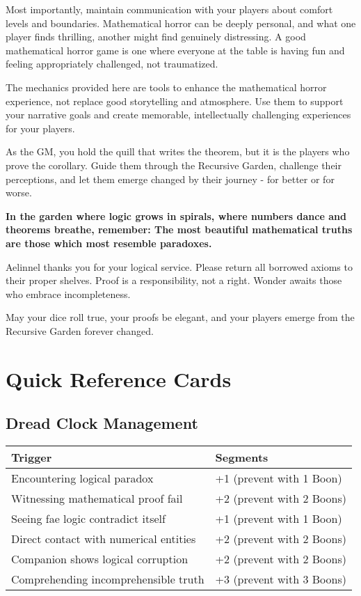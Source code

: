 \documentclass[11pt]{article}
\begin{document}
Most importantly, maintain communication with your players about comfort levels and boundaries. Mathematical horror can be deeply personal, and what one player finds thrilling, another might find genuinely distressing. A good mathematical horror game is one where everyone at the table is having fun and feeling appropriately challenged, not traumatized.

The mechanics provided here are tools to enhance the mathematical horror experience, not replace good storytelling and atmosphere. Use them to support your narrative goals and create memorable, intellectually challenging experiences for your players.

As the GM, you hold the quill that writes the theorem, but it is the players who prove the corollary. Guide them through the Recursive Garden, challenge their perceptions, and let them emerge changed by their journey - for better or for worse.

\begin{center}
\textbf{In the garden where logic grows in spirals, where numbers dance and theorems breathe, remember: The most beautiful mathematical truths are those which most resemble paradoxes.}
\end{center}

Aelinnel thanks you for your logical service. Please return all borrowed axioms to their proper shelves. Proof is a responsibility, not a right. Wonder awaits those who embrace incompleteness.

May your dice roll true, your proofs be elegant, and your players emerge from the Recursive Garden forever changed.

\newpage

\section*{Quick Reference Cards}

\subsection*{Dread Clock Management}

\begin{tabular}{|p{5cm}|p{7cm}|}
\hline
\rowcolor{tableheader}
\textbf{Trigger} & \textbf{Segments} \\
\hline
Encountering logical paradox & +1 (prevent with 1 Boon) \\
Witnessing mathematical proof fail & +2 (prevent with 2 Boons) \\
Seeing fae logic contradict itself & +1 (prevent with 1 Boon) \\
Direct contact with numerical entities & +2 (prevent with 2 Boons) \\
Companion shows logical corruption & +2 (prevent with 2 Boons) \\
Comprehending incomprehensible truth & +3 (prevent with 3 Boons) \\
\hline
\end{tabular}
\end{document}
